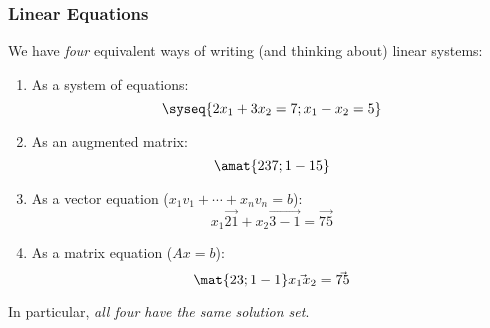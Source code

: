 




\begin{frame}
\frametitle{Linear Equations}

We have \emph{four} equivalent ways of writing (and thinking about) linear
systems:
\pause
\begin{enumerate}
\item As a system of equations:
\[ \syseq{2x_1 + 3x_2 = 7; x_1 - x_2 = 5} \]
\vskip-5mm\pause
\item As an augmented matrix:
  \vskip -3mm
  \[ \amat{ 2 3 7; 1 -1 5} \]
\vskip-5mm\pause
\item As a vector equation ($x_1v_1 + \cdots + x_nv_n = b$):
  \[ x_1\vec{2 1} + x_2\vec{3 -1} = \vec{7 5} \]
\vskip-7mm\pause
\item As a matrix equation ($Ax = b$):
  \[ \mat{ 2 3; 1 -1}\vec{x_1 x_2} = \vec{7 5} \]
\end{enumerate}
\pause

In particular, \emph{all four have the same solution set}.

\end{frame}



